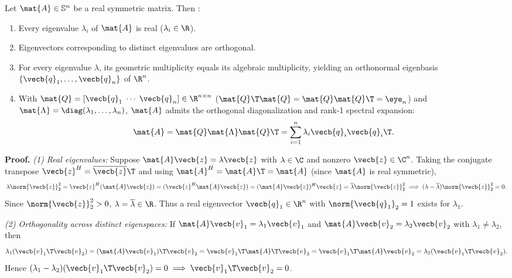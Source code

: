\documentclass[../../../../master.tex]{subfiles}
\begin{document}
\begin{coremath}
\label{thm:svd:spectral}
Let $\mat{A} \in \mathbb{S}^n$ be a real symmetric matrix. Then  :
\begin{enumerate}
  \item Every eigenvalue $\lambda_i$ of $\mat{A}$ is real ($\lambda_i \in \R$).
  \item Eigenvectors corresponding to distinct eigenvalues are orthogonal.
  \item For every eigenvalue $\lambda$, its geometric multiplicity equals its algebraic multiplicity, yielding an orthonormal eigenbasis $\{\vecb{q}_1,\dots,\vecb{q}_n\}$ of $\R^n$.
  \item With $\mat{Q} = [\vecb{q}_1 \;\cdots\; \vecb{q}_n] \in \R^{n \times n}$ ($\mat{Q}\T\mat{Q} = \mat{Q}\mat{Q}\T = \eye_n$) and $\mat{\Lambda} = \diag(\lambda_1,\dots,\lambda_n)$, $\mat{A}$ admits the orthogonal diagonalization and rank-1 spectral expansion:
  \begin{equation}
  \label{eq:svd:spectral}
    \mat{A} = \mat{Q}\mat{\Lambda}\mat{Q}\T = \sum_{i=1}^n \lambda_i \vecb{q}_i \vecb{q}_i\T.
  \end{equation}
\end{enumerate}

\textbf{Proof.}
\emph{(1) Real eigenvalues:} Suppose $\mat{A}\vecb{z} = \lambda \vecb{z}$ with $\lambda \in \C$ and nonzero $\vecb{z} \in \C^n$. Taking the conjugate transpose $\vecb{z}^H = \overline{\vecb{z}}\T$ and using $\mat{A}^H = \mat{A}\T = \mat{A}$ (since $\mat{A}$ is real symmetric),
\[
  \lambda \norm{\vecb{z}}_2^2 = \vecb{z}^H (\mat{A}\vecb{z}) = (\vecb{z}^H \mat{A}\vecb{z}) = (\mat{A}\vecb{z})^H \vecb{z} = \overline{\lambda}\norm{\vecb{z}}_2^2 \implies (\lambda - \overline{\lambda})\norm{\vecb{z}}_2^2 = 0.
\]
Since $\norm{\vecb{z}}_2^2 > 0$, $\lambda = \overline{\lambda} \in \R$. Thus a real eigenvector $\vecb{q}_1 \in \R^n$ with $\norm{\vecb{q}_1}_2 = 1$ exists for $\lambda_1$.

\emph{(2) Orthogonality across distinct eigenspaces:} If $\mat{A}\vecb{v}_1 = \lambda_1 \vecb{v}_1$ and $\mat{A}\vecb{v}_2 = \lambda_2 \vecb{v}_2$ with $\lambda_1 \neq \lambda_2$, then
\[
  \lambda_1 (\vecb{v}_1\T \vecb{v}_2) = (\mat{A}\vecb{v}_1)\T \vecb{v}_2 = \vecb{v}_1\T \mat{A}\T \vecb{v}_2 = \vecb{v}_1\T \mat{A}\vecb{v}_2 = \lambda_2 (\vecb{v}_1\T \vecb{v}_2).
\]
Hence $(\lambda_1 - \lambda_2)(\vecb{v}_1\T \vecb{v}_2) = 0 \implies \vecb{v}_1\T \vecb{v}_2 = 0$.


\end{coremath}
\end{document}
